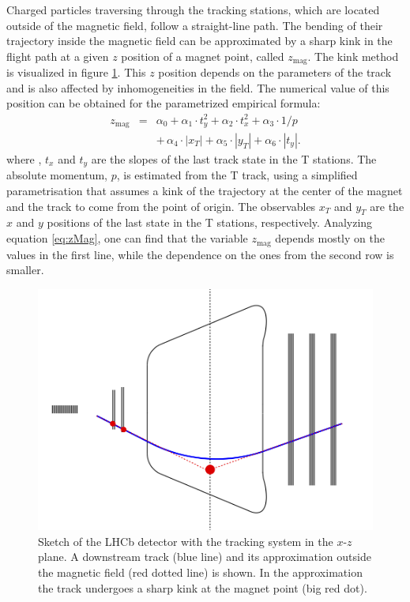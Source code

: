 Charged particles traversing through the tracking
stations, which are located outside of the magnetic field, follow a straight-line path. The bending of their trajectory inside the magnetic field can be approximated by a sharp kink in the flight path at a given $z$ position of a magnet point, called $z_{\text{mag}}$. The kink method is visualized in figure \ref{fig:magnetPointSketch}.
This $z$ position depends on the parameters of the track and is also affected by inhomogeneities in the field. The numerical value of this position can be obtained for the parametrized empirical formula: 
\begin{eqnarray}
\label{eq:zMag}
z_{\text{mag}} & = &\alpha_{0} + \alpha_{1} \cdot t_{y}^{2} + \alpha_{2} \cdot t_{x}^{2} + \alpha_{3} \cdot 1/p \\
& & +\, \alpha_{4} \cdot | x_{T} | + \alpha_{5} \cdot | y_{T} | + \alpha_{6} \cdot | t_{y} |. \nonumber
\end{eqnarray}
where , $t_{x}$ and $t_{y}$ are the slopes of the last track state in the
T stations. The absolute momentum, $p$, is
estimated from the T track, using a simplified parametrisation that assumes a kink of the trajectory at the center of the magnet and the track to come from the point of origin.
The observables $x_{T}$ and $y_{T}$ are the
$x$ and $y$ positions of the last state in the T stations, respectively. Analyzing equation \ref{eq:zMag}, one can find that the variable $z_{\text{mag}}$ depends mostly on the values in the first line, while the dependence on the ones from the second row is smaller.

\begin{figure}[!htbp]
 \begin{center}
    \includegraphics[width=0.49\linewidth]{figures/magnetPointDownstream2.png}
   \caption{Sketch of the LHCb detector with the tracking system in the $x$-$z$ plane. A downstream track (blue line) and its approximation outside the magnetic field (red dotted line) is shown. In the approximation the track undergoes a sharp kink at the magnet point (big red dot).
     \label{fig:magnetPointSketch}}
 \end{center}
\end{figure}


